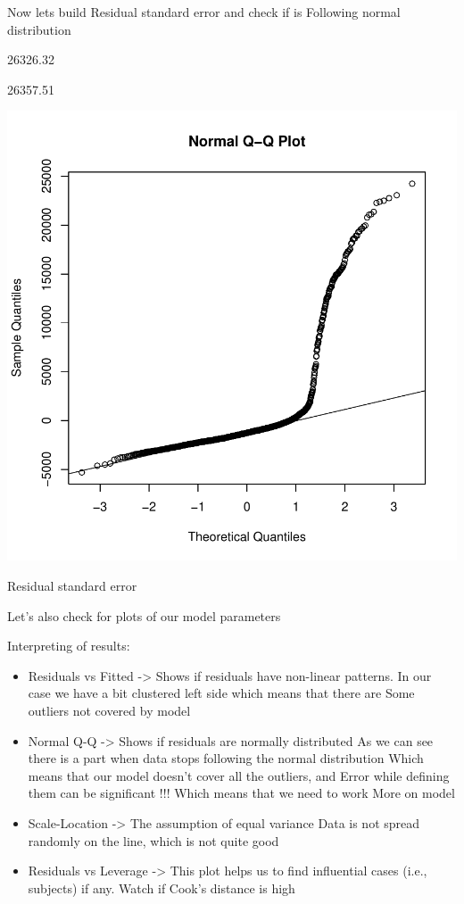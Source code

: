 \documentclass{article}
\begin{document}
Now lets build Residual standard error and check if is 
Following normal distribution

\begin{centerfig}
\begin{Schunk}
\begin{Soutput}
[1] 26326.32
\end{Soutput}
\begin{Soutput}
[1] 26357.51
\end{Soutput}
\end{Schunk}
\includegraphics{Untitled-058}
\caption{Residual standard error}
\end{centerfig}

Let's also check for plots of our model parameters

Interpreting of results:
\begin{itemize}
  \item Residuals vs Fitted -> Shows if residuals have non-linear patterns. 
  In our case we have a bit clustered left side which means that there are 
  Some outliers not covered by model 
  \item Normal Q-Q -> Shows if residuals are normally distributed
  As we can see there is a part when data stops following the normal distribution
  Which means that our model doesn't cover all the outliers, and 
  Error while defining them can be significant !!! Which means that we need to work
  More on model
  \item Scale-Location -> The assumption of equal variance
  Data is not spread randomly on the line, which is not quite good
  \item Residuals vs Leverage -> This plot helps us to find influential cases (i.e., subjects) if any. 
  Watch if Cook's distance is high

\end{itemize}
\end{document}
